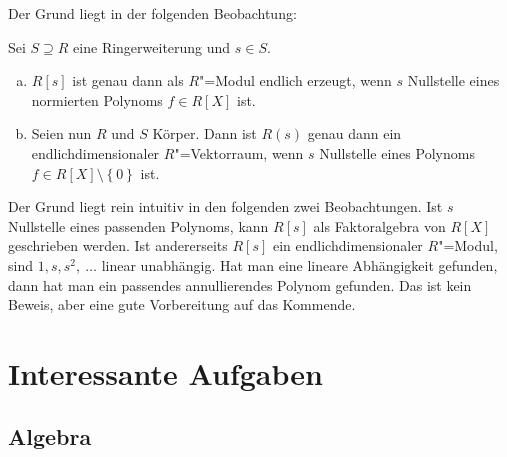 \documentclass[ngerman, 11pt, a4paper, twoside, abstracton]{scrbook}
\begin{document}
Der Grund liegt in der folgenden Beobachtung:

\begin{pattern}
  Sei $S\supseteq R$ eine Ringerweiterung und $s\in S$.

  \begin{enumerate}[(a)]
    \item $R\left[ s \right]$ ist genau dann als $R$"=Modul endlich erzeugt, wenn $s$ Nullstelle eines normierten Polynoms $f\in R\left[ X \right]$ ist.
    \item Seien nun $R$ und $S$ Körper. Dann ist $R\left( s \right)$ genau dann ein endlichdimensionaler $R$"=Vektorraum, wenn $s$ Nullstelle eines Polynoms $f\in R\left[ X \right]\setminus\left\{ 0 \right\}$ ist.
  \end{enumerate}

\end{pattern}

Der Grund liegt rein intuitiv in den folgenden zwei Beobachtungen. Ist $s$ Nullstelle eines passenden Polynoms, kann $R\left[ s \right]$ als Faktoralgebra von $R\left[ X \right]$ geschrieben werden. Ist andererseits $R\left[ s \right]$ ein endlichdimensionaler $R$"=Modul, sind $1, s, s^2,\ \dots$ linear unabhängig. Hat man eine lineare Abhängigkeit gefunden, dann hat man ein passendes annullierendes Polynom gefunden. Das ist kein Beweis, aber eine gute Vorbereitung auf das Kommende.

\appendix

\chapter{Interessante Aufgaben}

\section{Algebra}
\end{document}
